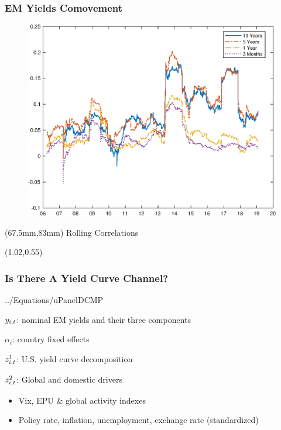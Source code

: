 \documentclass[12pt, aspectratio=169, xcolor=dvipsnames]{beamer}
\begin{document}
\begin{frame}[label=RollingCorr]
\frametitle{EM Yields Comovement}
\begin{figure}[!htbp]
	\begin{center} %
		\includegraphics[trim={0cm 0cm 0cm 0cm},clip,height=0.8\textheight,width=0.85\linewidth]{../Figures/Estimation/rolling_dn_data.eps}
		\par\end{center}
\end{figure}
\begin{textblock*}{10cm}(67.5mm,83mm)
	\footnotesize Rolling Correlations
\end{textblock*}
\begin{textblock*}{5cm}(1.02\textwidth,0.55\textheight)
	\hyperlink{DYindex}{}
\end{textblock*}
\end{frame}

\begin{frame}
\frametitle{Is There A Yield Curve Channel?}
 {../Equations/uPanelDCMP}

\(y_{i,t}\): nominal EM yields and their three components

\(\alpha_{i}\): country fixed effects

\(z^{1}_{i,t}\): U.S. yield curve decomposition \citep{KimWright:2005}

\(z^{2}_{i,t}\): Global and domestic drivers
\begin{itemize}
	\item Vix, EPU \citep{BakerBloomDavis:2016} \& global activity  \citep{Hamilton:2019} indexes
	\item Policy rate, inflation, unemployment, exchange rate (standardized) %
\end{itemize}

\end{frame}
\end{document}
